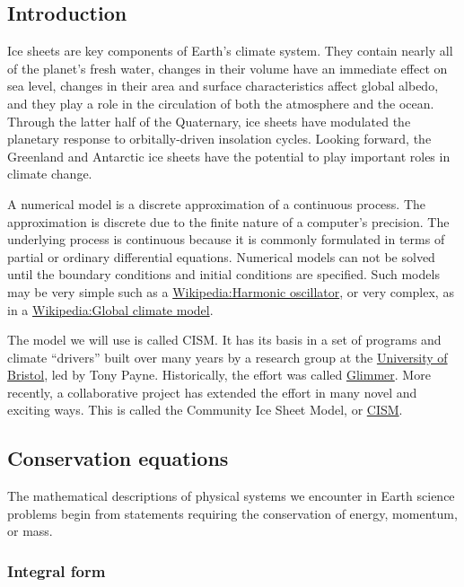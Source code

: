 \subsection{Introduction}

Ice sheets are key components of Earth's climate system. They contain
nearly all of the planet's fresh water, changes in their volume have an
immediate effect on sea level, changes in their area and surface
characteristics affect global albedo, and they play a role in the
circulation of both the atmosphere and the ocean. Through the latter
half of the Quaternary, ice sheets have modulated the planetary response
to orbitally-driven insolation cycles. Looking forward, the Greenland
and Antarctic ice sheets have the potential to play important roles in
climate change.

A numerical model is a discrete approximation of a continuous process.
The approximation is discrete due to the finite nature of a computer's
precision. The underlying process is continuous because it is commonly
formulated in terms of partial or ordinary differential equations.
Numerical models can not be solved until the boundary conditions and
initial conditions are specified. Such models may be very simple such as
a \href{Wikipedia:Harmonic oscillator}{Wikipedia:Harmonic oscillator},
or very complex, as in a
\href{Wikipedia:Global climate model}{Wikipedia:Global climate model}.

The model we will use is called CISM. It has its basis in a set of
programs and climate ``drivers'' built over many years by a research
group at the \href{http://www.bris.ac.uk/}{University of Bristol}, led
by Tony Payne. Historically, the effort was called
\href{http://forge.nesc.ac.uk/projects/glimmer/}{Glimmer}. More
recently, a collaborative project has extended the effort in many novel
and exciting ways. This is called the Community Ice Sheet Model, or
\href{http://websrv.cs.umt.edu/isis/}{CISM}.

\subsection{Conservation equations}

The mathematical descriptions of physical systems we encounter in Earth
science problems begin from statements requiring the conservation of
energy, momentum, or mass.

\subsubsection{Integral form}

